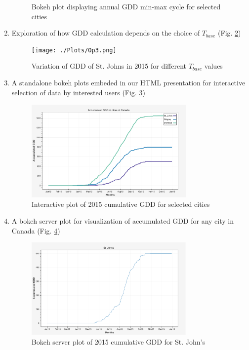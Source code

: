 \documentclass{article}
\begin{document}
\begin{enumerate}
\begin{center}
\begin{figure}[!h]
\caption{Bokeh plot displaying annual GDD min-max cycle for selected cities}
\label{bokeh_min-max}
\end{figure}
\end{center}
\item Exploration of how GDD calculation depends on the choice of $T_{base}$ (Fig. \ref{gdd_diff-tbase})
\begin{center}
\begin{figure}[!htb]
\texttt{[image: ./Plots/Op3.png]}
\caption{Variation of GDD of St. Johns in 2015 for different $T_{base}$ values}
\label{gdd_diff-tbase}
\end{figure}
\end{center}

\item A standalone bokeh plots embeded in our HTML presentation for interactive selection of data by interested users (Fig. \ref{gdd_interactive})
\begin{center}
\begin{figure}[!h]
\includegraphics[width=3.25in]{./source/Report/op-task_4.png}
\caption{Interactive plot of 2015 cumulative GDD for selected cities}
\label{gdd_interactive}
\end{figure}
\end{center}

\item A bokeh server plot for visualization of accumulated GDD for any city in Canada (Fig. \ref{bokeh-server-plot_sj})

\begin{center}
\begin{figure}[!h]
\includegraphics[width=3.25in]{./source/Report/op-task_5.png}
\caption{Bokeh server plot of 2015 cumulative GDD for St. John's}
\label{bokeh-server-plot_sj}
\end{figure}
\end{center}


\end{enumerate}
\end{document}
